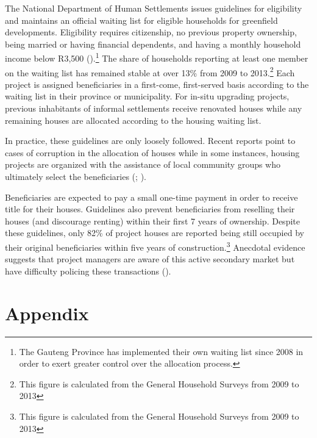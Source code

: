 \documentclass[12pt]{article}
\begin{document}
The National Department of Human Settlements issues guidelines for eligibility and maintains an official waiting list for eligible households for greenfield developments.  Eligibility requires citizenship, no previous property ownership, being married or having financial dependents, and having a monthly household income below R3,500 (\cite{seriq}).\footnote{The Gauteng Province has implemented their own waiting list since 2008 in order to exert greater control over the allocation process.}  The share of households reporting at least one member on the waiting list has remained stable at over 13\% from 2009 to 2013.\footnote{This figure is calculated from the General Household Surveys from 2009 to 2013}  Each project is assigned beneficiaries in a first-come, first-served basis according to the waiting list in their province or municipality.  For in-situ upgrading projects, previous inhabitants of informal settlements receive renovated houses while any remaining houses are allocated according to the housing waiting list.

In practice, these guidelines are only loosely followed.  Recent reports point to cases of corruption in the allocation of houses while in some instances, housing projects are organized with the assistance of local community groups who ultimately select the beneficiaries (\cite{seriq}; \cite{casestudytinazonke}). 

Beneficiaries are expected to pay a small one-time payment in order to receive title for their houses.  Guidelines also prevent beneficiaries from reselling their houses (and discourage renting) within their first 7 years of ownership.  Despite these guidelines, only 82\% of project houses are reported being still occupied by their original beneficiaries within five years of construction.\footnote{This figure is calculated from the General Household Surveys from 2009 to 2013}  Anecdotal evidence suggests that project managers are aware of this active secondary market but have difficulty policing these transactions (\cite{resale}).





{}
\nocite{*}
\singlespacing
\setlength\bibsep{0pt}








\appendix
\doublespacing

\section*{Appendix}
\end{document}
